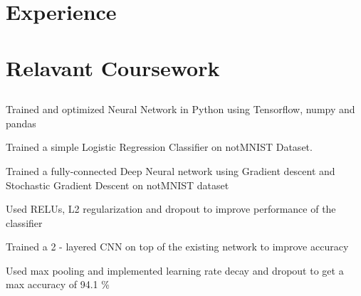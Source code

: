 \documentclass[]{deedy-resume-openfont}
\begin{document}
\hfill
\begin{minipage}[t]{0.66\textwidth} 


\section{Experience}

\sectionsep

\section{Relavant Coursework}

\subsection{ }

\begin{tightemize}


\item Trained and optimized Neural Network in Python using Tensorflow, numpy and pandas 
\item Trained a simple Logistic Regression Classifier on notMNIST Dataset.
\item Trained a fully-connected Deep Neural network using Gradient descent and Stochastic
Gradient Descent on notMNIST dataset
\item Used RELUs, L2 regularization and dropout to improve performance of the classifier
\item Trained a 2 - layered CNN on top of the existing network to improve accuracy
\item Used max pooling and implemented learning rate decay and dropout to get a max accuracy
of 94.1 \% 
\end{tightemize}



\end{minipage}
\end{document}
